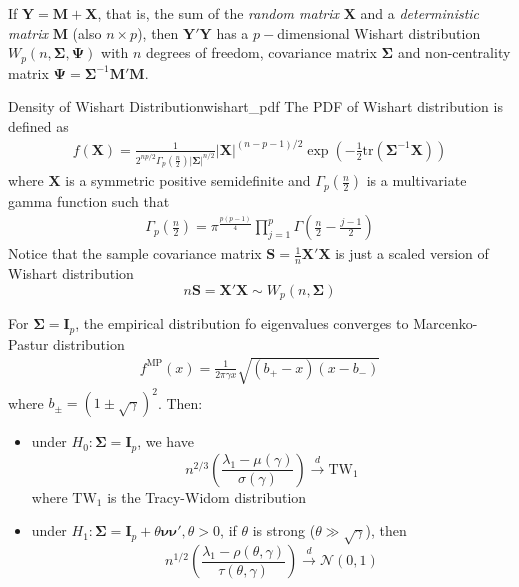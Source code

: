 \documentclass[twoside]{article}
\begin{document}
If $\mathbf{Y} = \mathbf{M} + \mathbf{X}$, that is, the sum of the \textit{random matrix} $\mathbf{X}$ and a \textit{deterministic matrix} $\mathbf{M}$ (also $n\times p$), then $\mathbf{Y}'\mathbf{Y}$ has a $p-$dimensional Wishart distribution $W_p(n,\boldsymbol{\Sigma},\boldsymbol{\Psi})$ with $n$ degrees of freedom, covariance matrix $\boldsymbol{\Sigma}$ and non-centrality matrix $\boldsymbol{\Psi}=\boldsymbol{\Sigma}^{-1}\mathbf{M}'\mathbf{M}$.
\begin{definition}{Density of Wishart Distribution}{wishart_pdf}
    The PDF of Wishart distribution is defined as 
    \begin{align*}
        f(\mathbf{X}) = \frac{1}{2^{np/2}{\Gamma}_p\left(\frac{n}{2}\right)\left\vert \boldsymbol{\Sigma}\right\vert^{n/2} } \left\vert \mathbf{X} \right\vert^{(n-p-1)/2}\exp \left(-\frac{1}{2}\mathrm{tr}\left(\boldsymbol{\Sigma}^{-1}\mathbf{X}\right)\right)
    \end{align*}
    where $\mathbf{X}$ is a symmetric positive semidefinite and ${\Gamma}_p\left(\frac{n}{2}\right)$ is a multivariate gamma function such that 
    \begin{align*}
        {\Gamma}_p\left( \frac{n}{2} \right) = \pi^{\frac{p(p-1)}{4}} \prod^p_{j=1}{\Gamma}\left(\frac{n}{2}-\frac{j-1}{2}\right)
    \end{align*}
    Notice that the sample covariance matrix $\mathbf{S}=\frac{1}{n}\mathbf{X}'\mathbf{X}$ is just a scaled version of Wishart distribution
    $$
        n\mathbf{S} = \mathbf{X}'\mathbf{X} \sim W_p(n,\boldsymbol{\Sigma})
    $$
\end{definition}
For $\boldsymbol{\Sigma}=\mathbf{I}_p$, the empirical distribution fo eigenvalues converges to Marcenko-Pastur distribution
\begin{align*}
    f^{\mathrm{MP}}(x) = \frac{1}{2\pi\gamma x}\sqrt{(b_+-x)(x-b_-)}
\end{align*}
where $b_{\pm} = (1\pm \sqrt{\gamma})^2$. Then:
\begin{itemize}
    \item under $H_0: \boldsymbol{\Sigma}= \mathbf{I}_p$, we have 
    $$
    n^{2/3}\left( \frac{\lambda_1 -\mu(\gamma)}{\sigma (\gamma)} \right) \xrightarrow{d} \mathrm{TW}_1
    $$
    where $\mathrm{TW}_1$ is the Tracy-Widom distribution
    \item under $H_1: \boldsymbol{\Sigma} = \mathbf{I}_p+ \theta\boldsymbol{\nu}\boldsymbol{\nu}', \theta>0$, if $\theta$ is strong ($\theta\gg \sqrt{\gamma}$), then
    $$
    n^{1/2}\left( \frac{\lambda_1 - \rho(\theta,\gamma)}{\tau (\theta,\gamma)} \right) \xrightarrow{d}\mathcal{N}(0,1)
    $$
\end{itemize}
\end{document}
